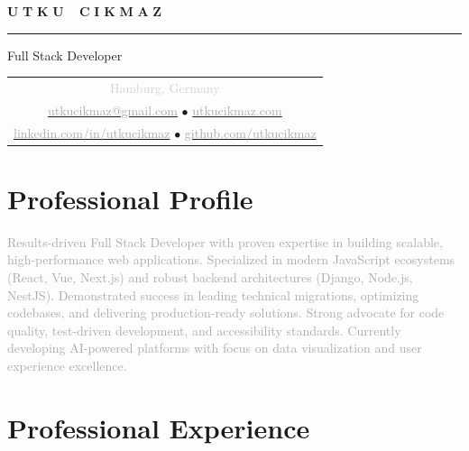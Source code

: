 \documentclass[10pt,a4paper]{article}
\newcommand{\gradientname}[1]{%
  \textcolor{darkgray!90}{\Huge\bfseries U}%
  \textcolor{darkgray!80}{\Huge\bfseries T}%
  \textcolor{darkgray!70}{\Huge\bfseries K}%
  \textcolor{darkgray!60}{\Huge\bfseries U}%
  \textcolor{mediumgray!90}{\Huge\bfseries\ }%
  \textcolor{mediumgray!80}{\Huge\bfseries C}%
  \textcolor{mediumgray!70}{\Huge\bfseries I}%
  \textcolor{mediumgray!60}{\Huge\bfseries K}%
  \textcolor{mediumgray!50}{\Huge\bfseries M}%
  \textcolor{lightgray!80}{\Huge\bfseries A}%
  \textcolor{lightgray!70}{\Huge\bfseries Z}%
}
\begin{document}
\color{black}
\pagestyle{empty}

\begin{center}
  \vspace{-3pt}
  \gradientname{UTKU CIKMAZ}
  
  \vspace{4pt}
  \textcolor{verylightgray}{\rule{0.35\textwidth}{0.6pt}}
  
  \vspace{4pt}
  {\large\color{mediumgray}Full Stack Developer}
  
  \vspace{5pt}
  \begin{tabular}{c}
    \textcolor{lightgray}{\small Hamburg, Germany} \\[2pt]
    \href{mailto:utkucikmaz@gmail.com}{\textcolor{darkgray}{utkucikmaz@gmail.com}} \quad
    \textcolor{verylightgray}{$\bullet$} \quad
    \href{https://www.utkucikmaz.com}{\textcolor{darkgray}{utkucikmaz.com}} \\[1pt]
    \href{https://linkedin.com/in/utkucikmaz}{\textcolor{darkgray}{linkedin.com/in/utkucikmaz}} \quad
    \textcolor{verylightgray}{$\bullet$} \quad
    \href{https://github.com/utkucikmaz}{\textcolor{darkgray}{github.com/utkucikmaz}}
  \end{tabular}
\end{center}

\vspace{1pt}

\section*{Professional Profile}
\vspace{0pt}
\textcolor{darkgray}{%
Results-driven Full Stack Developer with proven expertise in building scalable, high-performance web applications. Specialized in modern JavaScript ecosystems (React, Vue, Next.js) and robust backend architectures (Django, Node.js, NestJS). Demonstrated success in leading technical migrations, optimizing codebases, and delivering production-ready solutions. Strong advocate for code quality, test-driven development, and accessibility standards. Currently developing AI-powered platforms with focus on data visualization and user experience excellence.
}
\vspace{1pt}

\section*{Professional Experience}
\end{document}

